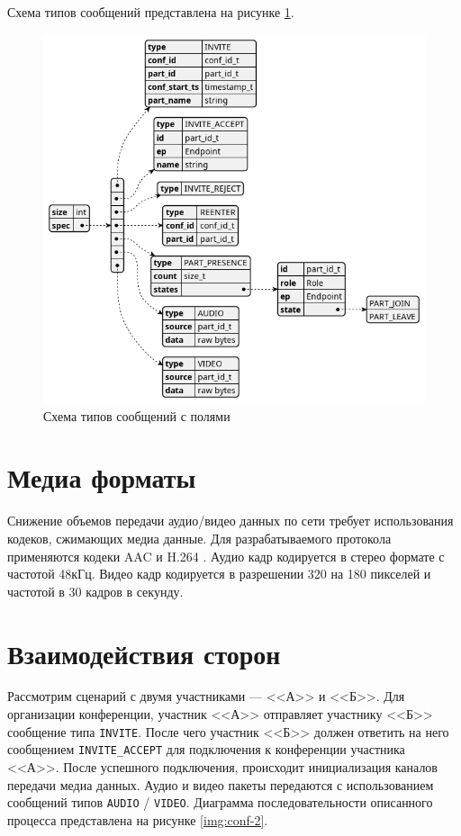 Схема типов сообщений представлена на рисунке \ref{img:msg-types}.
\begin{figure}[h!]
  \centering
  \includegraphics[width=\linewidth]{inc/diag/msg-types/msg-types.png}
  \caption{Схема типов сообщений с полями}
  \label{img:msg-types}
\end{figure}

\section{Медиа форматы}

Снижение объемов передачи аудио/видео данных по сети требует использования кодеков, сжимающих медиа данные. Для разрабатываемого протокола применяются кодеки AAC \cite{aac} и H.264 \cite{h264}. Аудио кадр кодируется в стерео формате с частотой 48кГц. Видео кадр кодируется в разрешении 320 на 180 пикселей и частотой в 30 кадров в секунду.

\section{Взаимодействия сторон}

Рассмотрим сценарий с двумя участниками --- <<А>> и <<Б>>. Для организации конференции, участник <<А>> отправляет участнику <<Б>> сообщение типа \texttt{INVITE}.
После чего участник <<Б>> должен ответить на него сообщением \texttt{INVITE\_ACCEPT} для подключения к конференции участника <<А>>.
После успешного подключения, происходит инициализация каналов передачи медиа данных. Аудио и видео пакеты передаются с использованием сообщений типов \texttt{AUDIO} / \texttt{VIDEO}.
Диаграмма последовательности описанного процесса представлена на рисунке \ref{img:conf-2}.

